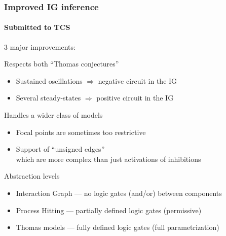 \begin{frame}[c]
  \frametitle{Improved IG inference}
  \framesubtitle{Submitted to TCS}


3 major improvements:

\bigskip
{} Respects both “Thomas conjectures”

\begin{itemize}
  \item Sustained oscillations $\Rightarrow$ negative circuit in the IG
  \item Several steady-states $\Rightarrow$ positive circuit in the IG
\end{itemize}

\bigskip
{} Handles a wider class of models

\begin{itemize}
  \item Focal points are sometimes too restrictive
  \item Support of “unsigned edges”\\
        which are more complex than just activations of inhibitions
\end{itemize}

\bigskip

 Abstraction levels

\begin{itemize}
  \item Interaction Graph --- no logic gates (and/or) between components
  \item Process Hitting --- partially defined logic gates (permissive)
  \item Thomas models --- fully defined logic gates (full parametrization)
\end{itemize}
\end{frame}
